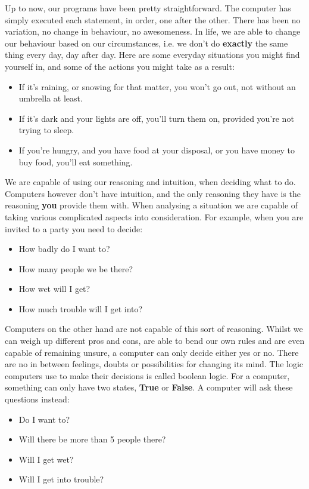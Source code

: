 
 Up to now, our programs have been pretty straightforward. The computer has simply executed each statement, in order, one after the other. There has been no variation, no change in behaviour, no awesomeness. In life, we are able to change our behaviour based on our circumstances, i.e. we don't do \textbf{exactly} the same thing every day, day after day. Here are some everyday situations you might find yourself in, and some of the actions you might take as a  result:
\begin{itemize}
	\item If it's raining, or snowing for that matter, you won't go out, not without an umbrella at least.
	\item If it's dark and your lights are off, you'll turn them on, provided you're not trying to sleep.
	\item If you're hungry, and you have food at your disposal, or you have money to buy food, you'll eat something.
\end{itemize}

We are capable of using our reasoning and intuition, when deciding what to do. Computers however don't have intuition, and the only reasoning they have is the reasoning \textbf{you} provide them with.   When analysing a situation we are capable of taking various complicated aspects into consideration. For example, when you are invited to a party you need to decide:
\begin{itemize}
	\item  How badly do I want to?
	\item  How many people we be there?
	\item  How wet will I get?
	\item  How much trouble will I get into?
\end{itemize}

 Computers on the other hand are not capable of this sort of reasoning. Whilst we can weigh up different pros and cons, are able to bend our own rules and are even capable of remaining unsure, a computer can only decide either yes or no. There are no in between feelings, doubts or possibilities for changing its mind.   The logic computers use to make their decisions is called boolean logic. For a computer, something can only have two states, \textbf{True} or \textbf{False}. A computer will ask these questions instead:
\begin{itemize}
	\item  Do I want to?
	\item  Will there be more than 5 people there?
	\item  Will I get wet?
	\item  Will I get into trouble?
\end{itemize}

